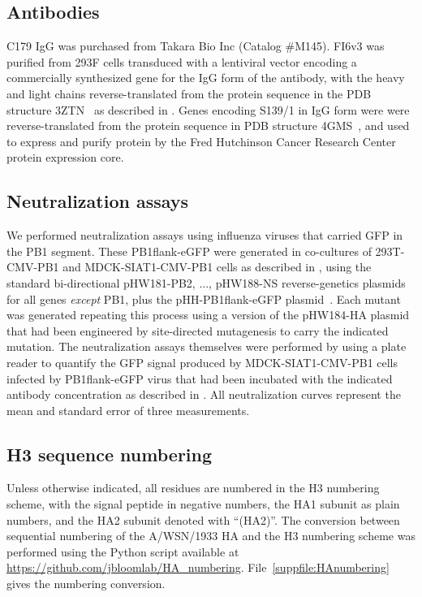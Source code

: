 \documentclass[11pt]{article}
\begin{document}
\subsection*{Antibodies}
C179 IgG was purchased from Takara Bio Inc (Catalog \#M145).
FI6v3 was purified from 293F cells transduced with a lentiviral vector encoding a commercially synthesized gene for the IgG form of the antibody, with the heavy and light chains reverse-translated from the protein sequence in the PDB structure 3ZTN~\citep{corti2011neutralizing} as described in \citet{balazs2013broad}.
Genes encoding S139/1 in IgG form were were reverse-translated from the protein sequence in PDB structure 4GMS~\citep{lee2012heterosubtypic}, and used to express and purify protein by the Fred Hutchinson Cancer Research Center protein expression core.

\subsection*{Neutralization assays}
We performed neutralization assays using influenza viruses that carried GFP in the PB1 segment.
These PB1flank-eGFP were generated in co-cultures of 293T-CMV-PB1 and MDCK-SIAT1-CMV-PB1 cells as described in \citet{bloom2010permissive}, using the standard bi-directional pHW181-PB2, ..., pHW188-NS reverse-genetics plasmids~\citep{hoffmann2000dna} for all genes \emph{except} PB1, plus the pHH-PB1flank-eGFP plasmid~\citep{bloom2010permissive}.
Each mutant was generated repeating this process using a version of the pHW184-HA plasmid that had been engineered by site-directed mutagenesis to carry the indicated mutation.
The neutralization assays themselves were performed by using a plate reader to quantify the GFP signal produced by MDCK-SIAT1-CMV-PB1 cells infected by PB1flank-eGFP virus that had been incubated with the indicated antibody concentration as described in \citet{hooper2013mutant}.
All neutralization curves represent the mean and standard error of three measurements. 
\subsection*{H3 sequence numbering}
Unless otherwise indicated, all residues are numbered in the H3 numbering scheme, with the signal peptide in negative numbers, the HA1 subunit as plain numbers, and the HA2 subunit denoted with ``(HA2)''. 
The conversion between sequential numbering of the A/WSN/1933 HA and the H3 numbering scheme was performed using the Python script available at \url{https://github.com/jbloomlab/HA_numbering}.
File~\ref{suppfile:HAnumbering} gives the numbering conversion.  
\end{document}
